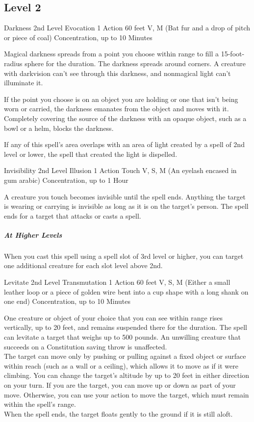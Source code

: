 \documentclass[letterpaper,openany,oneside,twocolumn]{book}
\begin{document}
\subsection*{Level 2}

\DndSpellHeader
  {Darkness}
  {2nd Level Evocation}
  {1 Action}
  {60 feet}
  {V, M (Bat fur and a drop of pitch or piece of coal)}
  {Concentration, up to 10 Minutes}
  
Magical darkness spreads from a point you choose within range to fill a 15-foot-radius sphere for the duration. The darkness spreads around corners. A creature with darkvision can't see through this darkness, and nonmagical light can't illuminate it.

If the point you choose is on an object you are holding or one that isn't being worn or carried, the darkness emanates from the object and moves with it. Completely covering the source of the darkness with an opaque object, such as a bowl or a helm, blocks the darkness.

If any of this spell's area overlaps with an area of light created by a spell of 2nd level or lower, the spell that created the light is dispelled.

\DndSpellHeader
  {Invisibility}
  {2nd Level Illusion}
  {1 Action}
  {Touch}
  {V, S, M (An eyelash encased in gum arabic)}
  {Concentration, up to 1 Hour}
  
A creature you touch becomes invisible until the spell ends. Anything the target is wearing or carrying is invisible as long as it is on the target's person. The spell ends for a target that attacks or casts a spell.

\subparagraph*{At Higher Levels} When you cast this spell using a spell slot of 3rd level or higher, you can target one additional creature for each slot level above 2nd.

\DndSpellHeader
  {Levitate}
  {2nd Level Transmutation}
  {1 Action}
  {60 feet}
  {V, S, M (Either a small leather loop or a piece of golden wire bent into a cup shape with a long shank on one end)}
  {Concentration, up to 10 Minutes}
  
One creature or object of your choice that you can see within range rises vertically, up to 20 feet, and remains suspended there for the duration. The spell can levitate a target that weighs up to 500 pounds. An unwilling creature that succeeds on a Constitution saving throw is unaffected.\\
The target can move only by pushing or pulling against a fixed object or surface within reach (such as a wall or a ceiling), which allows it to move as if it were climbing. You can change the target's altitude by up to 20 feet in either direction on your turn. If you are the target, you can move up or down as part of your move. Otherwise, you can use your action to move the target, which must remain within the spell's range.\\
When the spell ends, the target floats gently to the ground if it is still aloft.
\end{document}
